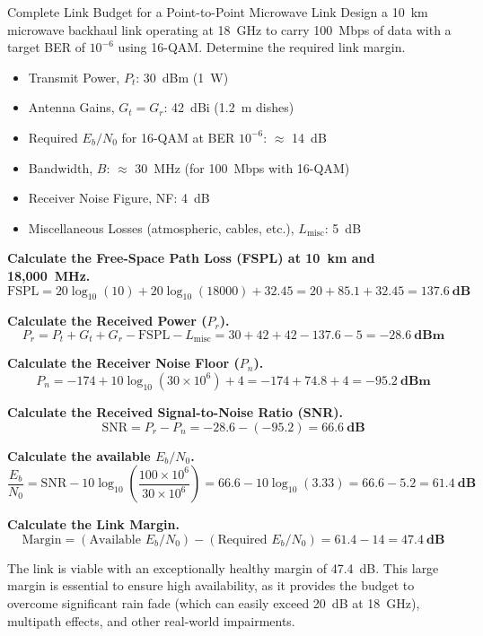 \begin{workedexample}{Complete Link Budget for a Point-to-Point Microwave Link}
    Design a 10~km microwave backhaul link operating at 18~GHz to carry 100~Mbps of data with a target BER of \(10^{-6}\) using 16-QAM. Determine the required link margin.

    \begin{itemize}
        \item Transmit Power, \(P_t\): 30~dBm (1~W)
        \item Antenna Gains, \(G_t = G_r\): 42~dBi (1.2~m dishes)
        \item Required \(E_b/N_0\) for 16-QAM at BER \(10^{-6}\): \(\approx\) 14~dB
        \item Bandwidth, \(B\): \(\approx\) 30~MHz (for 100~Mbps with 16-QAM)
        \item Receiver Noise Figure, NF: 4~dB
        \item Miscellaneous Losses (atmospheric, cables, etc.), \(L_{\text{misc}}\): 5~dB
    \end{itemize}

    \begin{derivationsteps}
        \step \textbf{Calculate the Free-Space Path Loss (FSPL) at 10~km and 18,000~MHz.}
        \[ \text{FSPL} = 20\log_{10}(10) + 20\log_{10}(18000) + 32.45 = 20 + 85.1 + 32.45 = \mathbf{137.6~\text{dB}} \]

        \step \textbf{Calculate the Received Power (\(P_r\)).}
        \[ P_r = P_t + G_t + G_r - \text{FSPL} - L_{\text{misc}} = 30 + 42 + 42 - 137.6 - 5 = \mathbf{-28.6~\text{dBm}} \]
        
        \step \textbf{Calculate the Receiver Noise Floor (\(P_n\)).}
        \[ P_n = -174 + 10\log_{10}(30 \times 10^6) + 4 = -174 + 74.8 + 4 = \mathbf{-95.2~\text{dBm}} \]
        
        \step \textbf{Calculate the Received Signal-to-Noise Ratio (SNR).}
        \[ \text{SNR} = P_r - P_n = -28.6 - (-95.2) = \mathbf{66.6~\text{dB}} \]
        
        \step \textbf{Calculate the available \(E_b/N_0\).}
        \[ \frac{E_b}{N_0} = \text{SNR} - 10\log_{10}\left(\frac{100 \times 10^6}{30 \times 10^6}\right) = 66.6 - 10\log_{10}(3.33) = 66.6 - 5.2 = \mathbf{61.4~\text{dB}} \]
        
        \step \textbf{Calculate the Link Margin.}
        \[ \text{Margin} = (\text{Available } E_b/N_0) - (\text{Required } E_b/N_0) = 61.4 - 14 = \mathbf{47.4~\text{dB}} \]
    \end{derivationsteps}

    The link is viable with an exceptionally healthy margin of 47.4~dB. This large margin is essential to ensure high availability, as it provides the budget to overcome significant rain fade (which can easily exceed 20~dB at 18~GHz), multipath effects, and other real-world impairments.
\end{workedexample}

